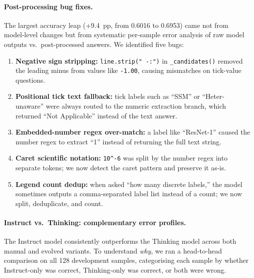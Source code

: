 \documentclass{article}
\begin{document}
\paragraph{Post-processing bug fixes.}
The largest accuracy leap (+9.4~pp, from 0.6016 to 0.6953) came not from
model-level changes but from systematic per-sample error analysis of raw model
outputs vs.\ post-processed answers. We identified five bugs:
\begin{enumerate}
  \item \textbf{Negative sign stripping:} \texttt{line.strip(" -:")} in
    \texttt{\_candidates()} removed the leading minus from values like
    \texttt{-1.00}, causing mismatches on tick-value questions.
  \item \textbf{Positional tick text fallback:} tick labels such as ``SSM'' or
    ``Heter-unaware'' were always routed to the numeric extraction branch,
    which returned ``Not Applicable'' instead of the text answer.
  \item \textbf{Embedded-number regex over-match:} a label like
    ``ResNet-1'' caused the number regex to extract ``1'' instead of returning
    the full text string.
  \item \textbf{Caret scientific notation:} \texttt{10\^{}-6} was split by
    the number regex into separate tokens; we now detect the caret pattern
    and preserve it as-is.
  \item \textbf{Legend count dedup:} when asked ``how many discrete labels,''
    the model sometimes outputs a comma-separated label list instead of a
    count; we now split, deduplicate, and count.
\end{enumerate}

\paragraph{Instruct vs.\ Thinking: complementary error profiles.}
The Instruct model consistently outperforms the Thinking model across both
manual and evolved variants. To understand \emph{why}, we ran a head-to-head
comparison on all 128 development samples, categorising each sample by whether
Instruct-only was correct, Thinking-only was correct, or both were wrong.
\end{document}
